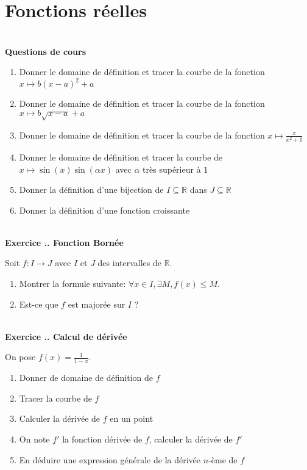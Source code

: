 \documentclass{article}
\newcommand{\ds}{\vspace{0.4\baselineskip}}
\newcommand{\mb}[1]{\mathbb{#1}}
\newcounter{exo}
\newcommand{\exercice}[1][\null]{\textbf{\\ \large Exercice \thesection.\theexo. \normalsize #1} \addtocounter{exo}{1}}
\newcommand{\cours}{\textbf{\ds \\ \large Questions de cours}}
\begin{document}
\section{Fonctions réelles}

\cours 

\begin{enumerate}
    \item Donner le domaine de définition et tracer 
        la courbe de la fonction $x \mapsto b (x - a)^2 + a$

    \item Donner le domaine de définition et tracer 
        la courbe de la fonction $x \mapsto b \sqrt{x - a} + a$

    \item Donner le domaine de définition et tracer 
        la courbe de la fonction $x \mapsto \frac{x}{x^2 + 1}$


    \item Donner le domaine de définition et tracer la courbe 
        de $x \mapsto \sin(x) \sin (\alpha x)$ avec $\alpha$ très
        supérieur à $1$

    \item Donner la définition d'une bijection de $I \subseteq \mb{R}$
        dans $J \subseteq \mb{R}$

    \item Donner la définition d'une fonction croissante 
\end{enumerate}

\exercice[Fonction Bornée]

Soit $f : I \to J$ avec $I$ et $J$ des intervalles de $\mb{R}$.

\begin{enumerate}
    \item Montrer la formule suivante: $\forall x \in I, \exists M, f(x) \leq
        M$.

    \item Est-ce que $f$ est majorée sur $I$ ?
\end{enumerate}

\exercice[Calcul de dérivée]

On pose $f(x) = \frac{1}{1-x}$.

\begin{enumerate}
    \item Donner de domaine de définition de $f$
    \item Tracer la courbe de $f$
    \item Calculer la dérivée de $f$ en un point
    \item On note $f'$ la fonction dérivée de $f$,
        calculer la dérivée de $f'$
    \item En déduire une expression générale 
        de la dérivée $n$-ème de $f$
\end{enumerate}
\end{document}
